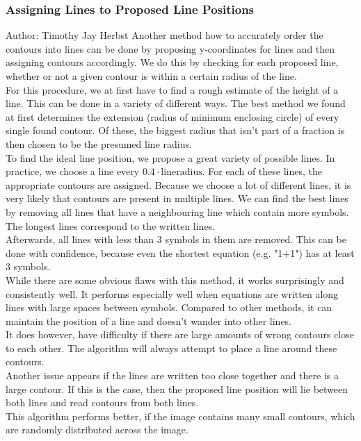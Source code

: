 \documentclass[11pt]{article}
\begin{document}
	\subsubsection{Assigning Lines to Proposed Line Positions}
	\small{Author: Timothy Jay Herbst} \newline \newline
	Another method how to accurately order the contours into lines can be done by proposing y-coordinates for lines and then assigning contours accordingly.
	We do this by checking for each proposed line, whether or not a given contour is within a certain radius of the line.\\
	For this procedure, we at first have to find a rough estimate of the height of a line.
	This can be done in a variety of different ways.
	The best method we found at first determines the extension (radius of minimum enclosing circle) of every single found contour.
	Of these, the biggest radius that isn't part of a fraction is then chosen to be the presumed line radius.\\
	To find the ideal line position, we propose a great variety of possible lines.
	In practice, we choose a line every $0.4 \cdot \mathrm{line radius}$.
	For each of these lines, the appropriate contours are assigned.
	Because we choose a lot of different lines, it is very likely that contours are present in multiple lines.
	We can find the best lines by removing all lines that have a neighbouring line which contain more symbols.
	The longest lines correspond to the written lines.\\
	Afterwards, all lines with less than 3 symbols in them are removed.
	This can be done with confidence, because even the shortest equation (e.g. "1+1") has at least 3 symbols.\\
	
	While there are some obvious flaws with this method, it works surprisingly and consistently well.
	It performs especially well when equations are written along lines with large spaces between symbols.
	Compared to other methods, it can maintain the position of a line and doesn't wander into other lines.\\
	It does however, have difficulty if there are large amounts of wrong contours close to each other.
	The algorithm will always attempt to place a line around these contours.\\
	Another issue appears if the lines are written too close together and there is a large contour.
	If this is the case, then the proposed line position will lie between both lines and read contours from both lines.\\
	This algorithm performs better, if the image contains many small contours, which are randomly distributed across the image.
	
\end{document}
